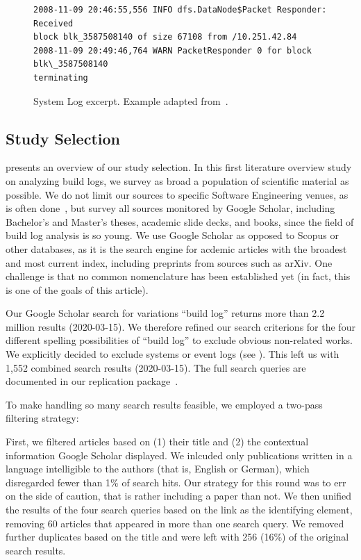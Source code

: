 \begin{figure}[!t]
  \centering
  \begin{lstlisting}[breaklines=true]
2008-11-09 20:46:55,556 INFO dfs.DataNode$Packet Responder: Received
block blk_3587508140 of size 67108 from /10.251.42.84
2008-11-09 20:49:46,764 WARN PacketResponder 0 for block blk\_3587508140
terminating
  \end{lstlisting}
  \caption{System Log excerpt.
Example adapted from~\cite{he2017towards}.}
  \label{lst:system-log}
\end{figure}

\subsection{Study Selection}
 presents an overview of our study selection.
In this first literature overview study on analyzing build logs, we
 survey as broad a population of scientific material as possible.
We
 do not limit our sources to specific Software Engineering venues, as
 is often done~\cite{petersen2015guidelines}, but survey all sources
 monitored by Google Scholar, including Bachelor's and Master's
 theses, academic slide decks, and books, since the field of build log
 analysis is so young.
We use Google Scholar as opposed to Scopus or
 other databases, as it is the search engine for acdemic articles with
 the broadest and most current index, including preprints from sources
 such as arXiv.
One challenge is that no common
nomenclature has been established yet (in fact, this is one of the
goals of this article).

Our Google Scholar
search for variations ``build log'' returns more than 2.2 million results
(2020-03-15).
We therefore refined our search criterions for the four
different spelling possibilities of ``build log'' to exclude obvious
non-related works.
We explicitly decided to exclude systems
or event logs (see ).
This left us with 1,552 combined search results
(2020-03-15).
The full search queries are documented in our replication
package~\cite{brandt2020chunk-replication}.

To make handling so many search results feasible, we employed a
two-pass filtering strategy:

First, we filtered articles based on (1) their title and (2) the
contextual information Google Scholar displayed.
We inlcuded only
publications written in a language intelligible to the authors (that
is, English or German), which disregarded fewer than 1\% of search
hits.
Our strategy for this round was to err on the side of
caution, that is rather including a paper than not.
We then unified
the results of the four search queries based on the link as the
identifying element, removing 60 articles that appeared in more than
one search query.
We removed further duplicates based on the title and were
left with 256 (16\%) of the original search results.

